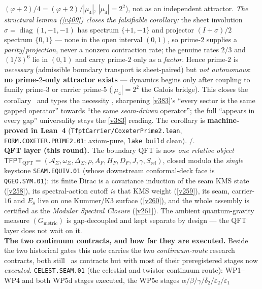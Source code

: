 \begin{keybox}
$(\varphi{+}2)/4=(\varphi{+}2)/|\mu_4|$, $|\mu_4|{=}2^2$), not as an independent attractor. \emph{The structural
lemma (\vref{v409}) closes the falsifiable corollary:} the sheet involution $\sigma{=}\operatorname{diag}(1,-1,-1)$
has spectrum $\{+1,-1\}$ and projector $(I{+}\sigma)/2$ spectrum $\{0,1\}$ --- none in the open interval $(0,1)$,
so prime-$2$ supplies a \emph{parity}/\emph{projection}, never a nonzero contraction rate; the genuine rates $2/3$
and $(1/3)^6$ lie in $(0,1)$ and carry prime-$2$ only as a \emph{factor}. Hence prime-$2$ is \emph{necessary}
(admissible boundary transport is sheet-paired) but \emph{not autonomous}: \textbf{no prime-$2$-only attractor
exists} --- dynamics begins only after coupling to family prime-$3$ or carrier prime-$5$ ($|\mu_4|{=}2^2$ the
Galois bridge). This closes the corollary \mE\ and types the necessity \mC, sharpening \vref{v383}'s ``every
sector is the same gapped operator'' towards ``the same \emph{seam-driven} operator''; the full ``appears in
every gap'' universality stays the \vref{v383} reading. The corollary is \textbf{machine-proved in Lean~4}
(\texttt{TfptCarrier/CoxeterPrime2.lean}, \texttt{FORM.COXETER.PRIME2.01}: axiom-pure, \texttt{lake build}
clean). \mE/\mC.
\smallskip\\
\noindent\textbf{QFT layer (this round).} The boundary QFT is now \emph{one relative object}
$\mathsf{TFPT}_{\mathrm{QFT}}=(\mathcal A_\Sigma,\omega_\Sigma,\Delta_\Sigma,\rho,A_F,H_F,D_F,J,\gamma,
S_{\mathrm{rel}})$, closed modulo the \emph{single} keystone \texttt{SEAM.EQUIV.01} (whose downstream
conformal-deck face is \texttt{QGEO.SYM.01}): its finite Dirac is a
covariance induction of the seam KMS state (\vref{v258}), its spectral-action cutoff \emph{is} that KMS
weight (\vref{v259}), its seam, carrier-$16$ and $E_8$ live on one Kummer/K3 surface (\vref{v260}), and the
whole assembly is certified as the \emph{Modular Spectral Closure} (\vref{v261}). The ambient
quantum-gravity measure $(G_{\mathrm{metric}})$ is gap-decoupled and kept separate by design --- the QFT
layer does not wait on it.
\smallskip\\
\noindent\textbf{The two continuum contracts, and how far they are executed.} Beside the two
historical gates this note carries the two \emph{continuum-route} research contracts, both still
\mO\ as contracts but with most of their preregistered stages now \emph{executed}.
\texttt{CELEST.SEAM.01} (the celestial and twistor continuum route): WP1--WP4 and both WP5d
stages executed, the WP5e stages $\alpha/\beta/\gamma/\delta_2/\varepsilon_2/\varepsilon_1$

\end{keybox}
